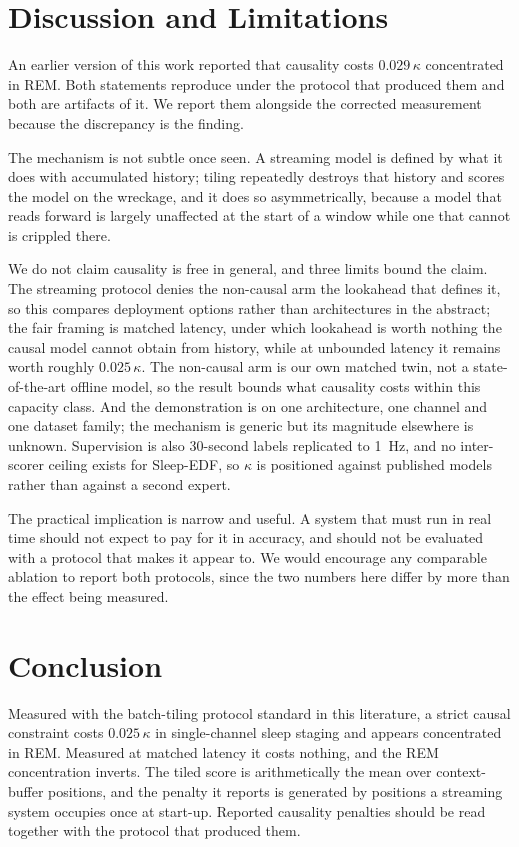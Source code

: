 \documentclass[conference]{IEEEtran}
\begin{document}
\section{Discussion and Limitations}

An earlier version of this work reported that causality costs $0.029\,\kappa$ concentrated in REM.
Both statements reproduce under the protocol that produced them and both are artifacts of it. We
report them alongside the corrected measurement because the discrepancy is the finding.

The mechanism is not subtle once seen. A streaming model is defined by what it does with accumulated
history; tiling repeatedly destroys that history and scores the model on the wreckage, and it does so
asymmetrically, because a model that reads forward is largely unaffected at the start of a window
while one that cannot is crippled there.

We do not claim causality is free in general, and three limits bound the claim. The streaming protocol
denies the non-causal arm the lookahead that defines it, so this compares deployment options rather
than architectures in the abstract; the fair framing is matched latency, under which lookahead is
worth nothing the causal model cannot obtain from history, while at unbounded latency it remains worth
roughly $0.025\,\kappa$. The non-causal arm is our own matched twin, not a state-of-the-art offline
model, so the result bounds what causality costs within this capacity class. And the demonstration is
on one architecture, one channel and one dataset family; the mechanism is generic but its magnitude
elsewhere is unknown. Supervision is also 30-second labels replicated to 1~Hz, and no inter-scorer
ceiling exists for Sleep-EDF, so $\kappa$ is positioned against published models rather than against a
second expert.

The practical implication is narrow and useful. A system that must run in real time should not expect
to pay for it in accuracy, and should not be evaluated with a protocol that makes it appear to. We
would encourage any comparable ablation to report both protocols, since the two numbers here differ by
more than the effect being measured.

\section{Conclusion}

Measured with the batch-tiling protocol standard in this literature, a strict causal constraint costs
$0.025\,\kappa$ in single-channel sleep staging and appears concentrated in REM. Measured at matched
latency it costs nothing, and the REM concentration inverts. The tiled score is arithmetically the mean
over context-buffer positions, and the penalty it reports is generated by positions a streaming system
occupies once at start-up. Reported causality penalties should be read together with the protocol that
produced them.
\end{document}
